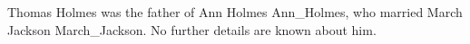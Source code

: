 
Thomas Holmes was the father of Ann Holmes {Ann_Holmes}, who married March Jackson {March_Jackson}.  No further details are known about him.
